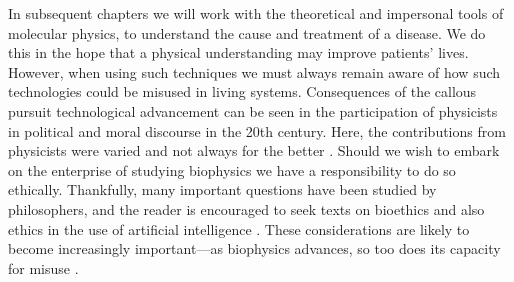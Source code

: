 In subsequent chapters we will work with the theoretical and impersonal tools of molecular physics, to understand the cause and treatment of a disease. We do this in the hope that a physical understanding may improve patients' lives. However, when using such techniques we must always remain aware of how such technologies could be misused in living systems. Consequences of the callous pursuit technological advancement can be seen in the participation of physicists in political and moral discourse in the 20th century. Here, the contributions from physicists were varied and not always for the better \cite{frank1993, gottfried1999, global2009, rhodes1986, aaronson2008, berger2016, vonneumann_britanica}. Should we wish to embark on the enterprise of studying biophysics we have a responsibility to do so ethically. Thankfully, many important questions have been studied by philosophers, and the reader is encouraged to seek texts on bioethics and also ethics in the use of artificial intelligence \cite{buchanan2000, taneri2011, genome_editting_guildelines_2017, muller2021, bostrom2014}. These considerations are likely to become increasingly important---as biophysics advances, so too does its capacity for misuse \cite{mallapaty2022, urbina2022}. 



